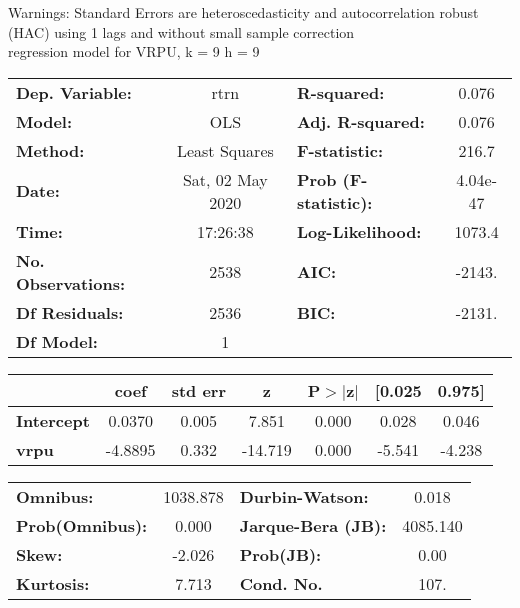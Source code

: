 Warnings: \newline
 [1] Standard Errors are heteroscedasticity and autocorrelation robust (HAC) using 1 lags and without small sample correction\\ 

regression model for VRPU, k = 9 h = 9\begin{center}
\begin{tabular}{lclc}
\toprule
\textbf{Dep. Variable:}    &       rtrn       & \textbf{  R-squared:         } &     0.076   \\
\textbf{Model:}            &       OLS        & \textbf{  Adj. R-squared:    } &     0.076   \\
\textbf{Method:}           &  Least Squares   & \textbf{  F-statistic:       } &     216.7   \\
\textbf{Date:}             & Sat, 02 May 2020 & \textbf{  Prob (F-statistic):} &  4.04e-47   \\
\textbf{Time:}             &     17:26:38     & \textbf{  Log-Likelihood:    } &    1073.4   \\
\textbf{No. Observations:} &        2538      & \textbf{  AIC:               } &    -2143.   \\
\textbf{Df Residuals:}     &        2536      & \textbf{  BIC:               } &    -2131.   \\
\textbf{Df Model:}         &           1      & \textbf{                     } &             \\
\bottomrule
\end{tabular}
\begin{tabular}{lcccccc}
                   & \textbf{coef} & \textbf{std err} & \textbf{z} & \textbf{P$> |$z$|$} & \textbf{[0.025} & \textbf{0.975]}  \\
\midrule
\textbf{Intercept} &       0.0370  &        0.005     &     7.851  &         0.000        &        0.028    &        0.046     \\
\textbf{vrpu}      &      -4.8895  &        0.332     &   -14.719  &         0.000        &       -5.541    &       -4.238     \\
\bottomrule
\end{tabular}
\begin{tabular}{lclc}
\textbf{Omnibus:}       & 1038.878 & \textbf{  Durbin-Watson:     } &    0.018  \\
\textbf{Prob(Omnibus):} &   0.000  & \textbf{  Jarque-Bera (JB):  } & 4085.140  \\
\textbf{Skew:}          &  -2.026  & \textbf{  Prob(JB):          } &     0.00  \\
\textbf{Kurtosis:}      &   7.713  & \textbf{  Cond. No.          } &     107.  \\
\bottomrule
\end{tabular}
\end{center}


